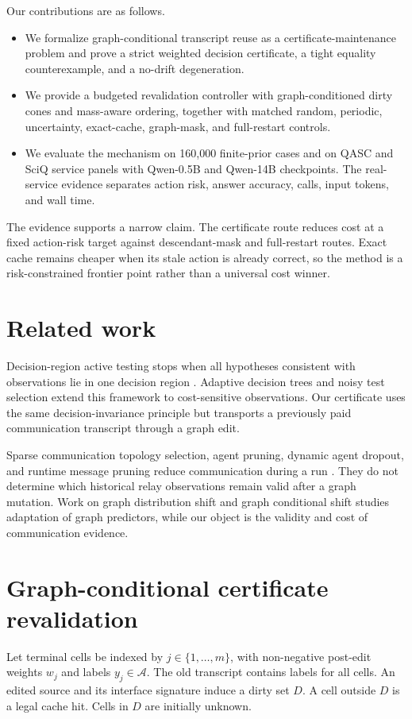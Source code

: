 \documentclass[11pt]{article}
\begin{document}
Our contributions are as follows.
\begin{itemize}
\item We formalize graph-conditional transcript reuse as a certificate-maintenance problem and prove a strict weighted decision certificate, a tight equality counterexample, and a no-drift degeneration.
\item We provide a budgeted revalidation controller with graph-conditioned dirty cones and mass-aware ordering, together with matched random, periodic, uncertainty, exact-cache, graph-mask, and full-restart controls.
\item We evaluate the mechanism on 160,000 finite-prior cases and on QASC and SciQ service panels with Qwen-0.5B and Qwen-14B checkpoints. The real-service evidence separates action risk, answer accuracy, calls, input tokens, and wall time.
\end{itemize}

The evidence supports a narrow claim. The certificate route reduces cost at a fixed action-risk target against descendant-mask and full-restart routes. Exact cache remains cheaper when its stale action is already correct, so the method is a risk-constrained frontier point rather than a universal cost winner.

\section{Related work}
Decision-region active testing stops when all hypotheses consistent with observations lie in one decision region \citep{javdani2014}. Adaptive decision trees and noisy test selection extend this framework to cost-sensitive observations. Our certificate uses the same decision-invariance principle but transports a previously paid communication transcript through a graph edit.

Sparse communication topology selection, agent pruning, dynamic agent dropout, and runtime message pruning reduce communication during a run \citep{li2024sparse,zhang2025agentprune,wang2025agentdropout,you2026messagesieve}. They do not determine which historical relay observations remain valid after a graph mutation. Work on graph distribution shift and graph conditional shift studies adaptation of graph predictors, while our object is the validity and cost of communication evidence.

\section{Graph-conditional certificate revalidation}
Let terminal cells be indexed by $j\in\{1,\ldots,m\}$, with non-negative post-edit weights $w_j$ and labels $y_j\in\mathcal{A}$. The old transcript contains labels for all cells. An edited source and its interface signature induce a dirty set $D$. A cell outside $D$ is a legal cache hit. Cells in $D$ are initially unknown.
\end{document}
